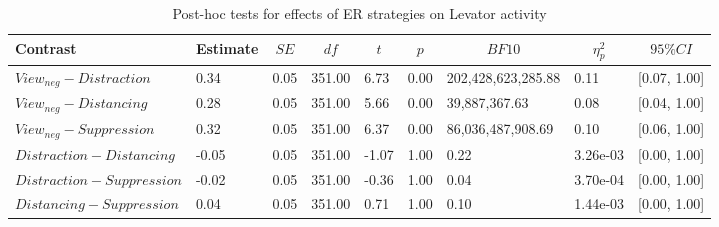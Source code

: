 \documentclass[
  man,floatsintext]{apa6}
\begin{document}
\begin{table}[H]

\begin{center}
\begin{threeparttable}

\caption{\label{tab:SupplEffectER}Post-hoc tests for effects of ER strategies on Levator activity}

\footnotesize{

\begin{tabular}{lllllllll}
\toprule
Contrast & \multicolumn{1}{c}{Estimate} & \multicolumn{1}{c}{$SE$} & \multicolumn{1}{c}{$df$} & \multicolumn{1}{c}{$t$} & \multicolumn{1}{c}{$p$} & \multicolumn{1}{c}{$BF10$} & \multicolumn{1}{c}{$\eta_{p}^{2}$} & \multicolumn{1}{c}{$95\% CI$}\\
\midrule
$View_{neg} - Distraction$ & 0.34 & 0.05 & 351.00 & 6.73 & 0.00 & 202,428,623,285.88 & 0.11 & {}[0.07, 1.00]\\
$View_{neg} - Distancing$ & 0.28 & 0.05 & 351.00 & 5.66 & 0.00 & 39,887,367.63 & 0.08 & {}[0.04, 1.00]\\
$View_{neg} - Suppression$ & 0.32 & 0.05 & 351.00 & 6.37 & 0.00 & 86,036,487,908.69 & 0.10 & {}[0.06, 1.00]\\
$Distraction - Distancing$ & -0.05 & 0.05 & 351.00 & -1.07 & 1.00 & 0.22 & 3.26e-03 & {}[0.00, 1.00]\\
$Distraction - Suppression$ & -0.02 & 0.05 & 351.00 & -0.36 & 1.00 & 0.04 & 3.70e-04 & {}[0.00, 1.00]\\
$Distancing - Suppression$ & 0.04 & 0.05 & 351.00 & 0.71 & 1.00 & 0.10 & 1.44e-03 & {}[0.00, 1.00]\\
\bottomrule
\end{tabular}

}

\end{threeparttable}
\end{center}

\end{table}
\end{document}
